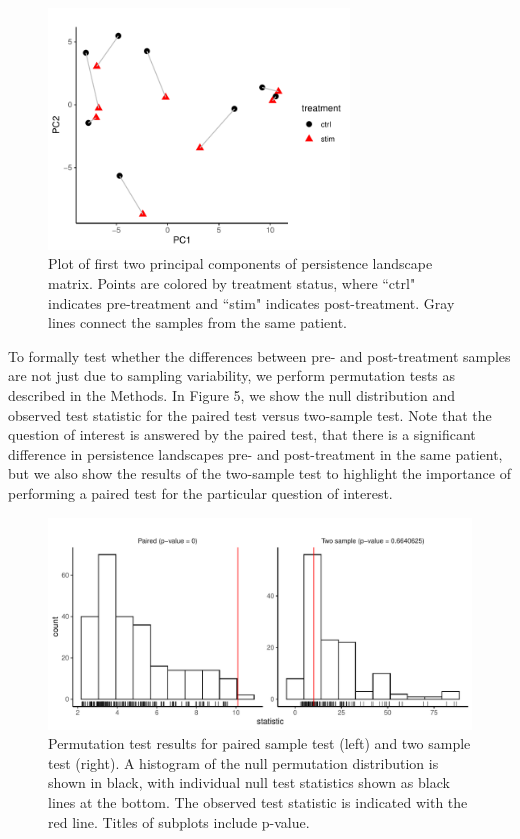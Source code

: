 \documentclass[11pt]{article}
\begin{document}
\begin{figure}[!htb]
    \centering
	\includegraphics[width=8cm]{results/all_persistence_landscape_pca.pdf}
    \caption{Plot of first two principal components of persistence landscape matrix. Points are colored by treatment status, where ``ctrl" indicates pre-treatment and ``stim" indicates post-treatment. Gray lines connect the samples from the same patient.}
\end{figure}

To formally test whether the differences between pre- and post-treatment samples are not just due to sampling variability, we perform permutation tests as described in the Methods. In Figure 5, we show the null distribution and observed test statistic for the paired test versus two-sample test. Note that the question of interest is answered by the paired test, that there is a significant difference in persistence landscapes pre- and post-treatment in the same patient, but we also show the results of the two-sample test to highlight the importance of performing a paired test for the particular question of interest.

\begin{figure}[!htb]
    \centering
	\includegraphics[width=15cm]{results/all_permutation_test.pdf}
    \caption{Permutation test results for paired sample test (left) and two sample test (right). A histogram of the null permutation distribution is shown in black, with individual null test statistics shown as black lines at the bottom. The observed test statistic is indicated with the red line. Titles of subplots include p-value.}
\end{figure}
\end{document}
